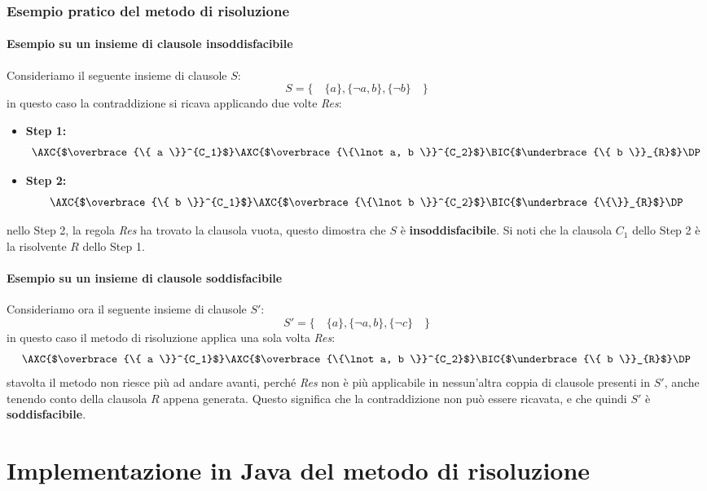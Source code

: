 \documentclass[a4paper,12pt]{report}
\begin{document}
\subsection{Esempio pratico del metodo di risoluzione}
\subsubsection{Esempio su un insieme di clausole insoddisfacibile}
\label{resolution_example}
Consideriamo il seguente insieme di clausole $S$:
\[ S = \{ \quad \{a\}, \{\lnot a, b\}, \{\lnot b\} \quad \} \]
in questo caso la contraddizione si ricava applicando due volte \emph{Res}:

\begin{itemize}
    \item \textbf{Step 1:}
    \[
    \AXC{$\overbrace{\{ a \}}^{C_1}$}
    \AXC{$\overbrace{\{\lnot a, b \}}^{C_2}$}
    \RightLabel{Res}
    \BIC{$\underbrace{\{ b \}}_{R}$}
    \DP
    \]
    \item \textbf{Step 2:}
    \[
    \AXC{$\overbrace{\{ b \}}^{C_1}$}
    \AXC{$\overbrace{\{\lnot b \}}^{C_2}$}
    \RightLabel{Res}
    \BIC{$\underbrace{\{\}}_{R}$}
    \DP
    \]
\end{itemize}
nello Step 2, la regola \emph{Res} ha trovato la clausola vuota, questo dimostra che $S$ è \textbf{insoddisfacibile}. Si noti che la clausola $C_1$ dello Step 2 è la risolvente $R$ dello Step 1.

\subsubsection{Esempio su un insieme di clausole soddisfacibile}
Consideriamo ora il seguente insieme di clausole $S'$:
\[ S' = \{ \quad \{a\}, \{\lnot a, b\}, \{\lnot c\} \quad \} \]
in questo caso il metodo di risoluzione applica una sola volta \emph{Res}:
\[
    \AXC{$\overbrace{\{ a \}}^{C_1}$}
    \AXC{$\overbrace{\{\lnot a, b \}}^{C_2}$}
    \RightLabel{Res}
    \BIC{$\underbrace{\{ b \}}_{R}$}
    \DP
\]
stavolta il metodo non riesce più ad andare avanti, perché \emph{Res} non è più applicabile in nessun'altra coppia di clausole presenti in $S'$, anche tenendo conto della clausola $R$ appena generata. Questo significa che la contraddizione non può essere ricavata, e che quindi $S'$ è \textbf{soddisfacibile}.

% 
% 
\chapter{Implementazione in Java del metodo di risoluzione}
\label{impl}
\end{document}
